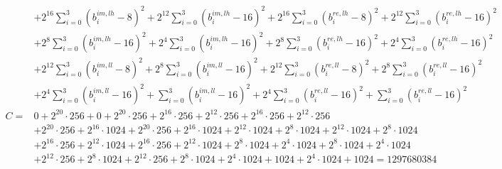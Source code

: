 \documentclass[fleqn]{article}
\begin{document}
{\[{\begin{aligned}
  & + 2^{16}\!\sum_{i=0}^{3}(b_i^{im,lh}{-}8)^2 + 2^{12}\!\sum_{i=0}^{3}(b_i^{im,lh}{-}16)^2 + 2^{16}\!\sum_{i=0}^{3}(b_i^{re,lh}{-}8)^2 + 2^{12}\!\sum_{i=0}^{3}(b_i^{re,lh}{-}16)^2 \\
  & + 2^{8}\!\sum_{i=0}^{3}(b_i^{im,lh}{-}16)^2 + 2^{4}\!\sum_{i=0}^{3}(b_i^{im,lh}{-}16)^2 + 2^{8}\!\sum_{i=0}^{3}(b_i^{re,lh}{-}16)^2 + 2^{4}\!\sum_{i=0}^{3}(b_i^{re,lh}{-}16)^2 \\
  & + 2^{12}\!\sum_{i=0}^{3}(b_i^{im,ll}{-}8)^2 + 2^{8}\!\sum_{i=0}^{3}(b_i^{im,ll}{-}16)^2 + 2^{12}\!\sum_{i=0}^{3}(b_i^{re,ll}{-}8)^2 + 2^{8}\!\sum_{i=0}^{3}(b_i^{re,ll}{-}16)^2 \\
  & + 2^{4}\!\sum_{i=0}^{3}(b_i^{im,ll}{-}16)^2 + \sum_{i=0}^{3}(b_i^{im,ll}{-}16)^2 + 2^{4}\!\sum_{i=0}^{3}(b_i^{re,ll}{-}16)^2 + \sum_{i=0}^{3}(b_i^{re,ll}{-}16)^2 \\[0.35em]
C ={}& 0 + 2^{20}\!\cdot\!256 + 0 + 2^{20}\!\cdot\!256 + 2^{16}\!\cdot\!256 + 2^{12}\!\cdot\!256 + 2^{16}\!\cdot\!256 + 2^{12}\!\cdot\!256 \\
  & + 2^{20}\!\cdot\!256 + 2^{16}\!\cdot\!1024 + 2^{20}\!\cdot\!256 + 2^{16}\!\cdot\!1024 + 2^{12}\!\cdot\!1024 + 2^{8}\!\cdot\!1024 + 2^{12}\!\cdot\!1024 + 2^{8}\!\cdot\!1024 \\
  & + 2^{16}\!\cdot\!256 + 2^{12}\!\cdot\!1024 + 2^{16}\!\cdot\!256 + 2^{12}\!\cdot\!1024 + 2^{8}\!\cdot\!1024 + 2^{4}\!\cdot\!1024 + 2^{8}\!\cdot\!1024 + 2^{4}\!\cdot\!1024 \\
  & + 2^{12}\!\cdot\!256 + 2^{8}\!\cdot\!1024 + 2^{12}\!\cdot\!256 + 2^{8}\!\cdot\!1024 + 2^{4}\!\cdot\!1024 + 1024 + 2^{4}\!\cdot\!1024 + 1024 = 1297680384
\end{aligned}
\;}
\]
}
\end{document}

